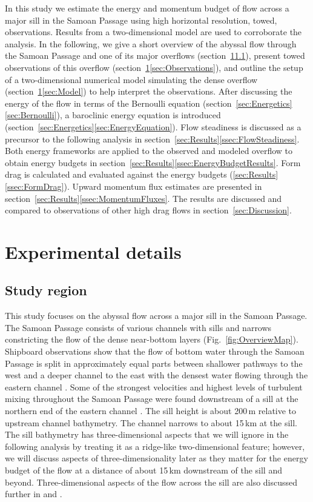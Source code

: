 \documentclass{ametsocV6.1}
\begin{document}
In this study we estimate the energy and momentum budget of flow across a major sill in the Samoan Passage using high horizontal resolution, towed, observations.
Results from a two-dimensional model are used to corroborate the analysis.
In the following, we give a short overview of the abyssal flow through the Samoan Passage and one of its major overflows (section~\ref{sec:ExperimentalDetails}\ref{sec:StudyRegion}), present towed observations of this overflow (section~\ref{sec:ExperimentalDetails}\ref{sec:Observations}),  and outline the setup of a two-dimensional numerical model simulating the dense overflow (section~\ref{sec:ExperimentalDetails}\ref{sec:Model}) to help interpret the observations.
After discussing the energy of the flow in terms of the Bernoulli equation (section~\ref{sec:Energetics}\ref{sec:Bernoulli}), a baroclinic energy equation is introduced (section~\ref{sec:Energetics}\ref{sec:EnergyEquation}).
Flow steadiness is discussed as a precursor to the following analysis in section~\ref{sec:Results}\ref{ssec:FlowSteadiness}.
Both energy frameworks are applied to the observed and modeled overflow to obtain energy budgets in section~\ref{sec:Results}\ref{ssec:EnergyBudgetResults}.
Form drag is calculated and evaluated against the energy budgets (\ref{sec:Results}\ref{ssec:FormDrag}).
Upward momentum flux estimates are presented in section~\ref{sec:Results}\ref{ssec:MomentumFluxes}.
The results are discussed and compared to observations of other high drag flows in section~\ref{sec:Discussion}.

\section{Experimental details}\label{sec:ExperimentalDetails}

\subsection{Study region}\label{sec:StudyRegion}
This study focuses on the abyssal flow across a major sill in the Samoan Passage.
The Samoan Passage consists of various channels with sills and narrows constricting the flow of the dense near-bottom layers (Fig.~\ref{fig:OverviewMap}).
Shipboard observations show that the flow of bottom water through the Samoan Passage is split in approximately equal parts between shallower pathways to the west and a deeper channel to the east with the densest water flowing through the eastern channel \citep{voetetal15}.
Some of the strongest velocities and highest levels of turbulent mixing throughout the Samoan Passage were found downstream of a sill at the northern end of the eastern channel \citep{alfordetal13c}.
The sill height is about 200\,m relative to upstream channel bathymetry.
The channel narrows to about 15\,km at the sill.
The sill bathymetry has three-dimensional aspects that we will ignore in the following analysis by treating it as a ridge-like two-dimensional feature; however, we will discuss aspects of three-dimensionality later as they matter for the energy budget of the flow at a distance of about 15\,km downstream of the sill and beyond.
Three-dimensional aspects of the flow across the sill are also discussed further in \citet{girtonetal19} and \citet{cusacketal21}.
\end{document}
